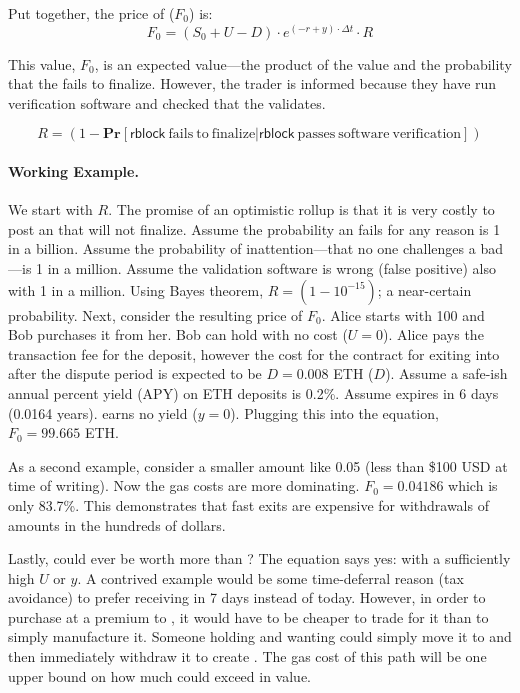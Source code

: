 Put together, the price of \ethxx ($F_0$) is: \[ F_0 = (S_0 + U - D)\cdot e^{(-r+y)\cdot\Delta t} \cdot R \]

This value, $F_0$, is an expected value---the product of the value and the probability that the \rblock fails to finalize. However, the trader is informed because they have run verification software and checked that the \rblock validates.


\[ R = (1-\mathbf{Pr}[ \mathrm{\mathsf{rblock}~fails~to~finalize} |  \mathrm{\mathsf{rblock}~passes~software~verification} ]) \]

\paragraph*{Working Example.} We start with $R$. The promise of an optimistic rollup is that it is very costly to post an \rblock that will not finalize. Assume the probability an \rblock fails for any reason is 1 in a billion. Assume the probability of inattention---that no one challenges a bad \rblock---is 1 in a million. Assume the validation software is wrong (false positive) also with 1 in a million. Using Bayes theorem, $R=(1-10^{-15})$; a near-certain probability. Next, consider the resulting price of $F_0$. Alice starts with 100 \ethxx and Bob purchases it from her. Bob can hold \ethxx with no cost ($U=0$). Alice pays the transaction fee for the deposit, however the cost for the contract for exiting \ethxx into \ethone after the dispute period is expected to be $D=0.008$ ETH ($D$). Assume a safe-ish annual percent yield (APY) on ETH deposits is 0.2\%. Assume \ethxx expires in 6 days (0.0164 years). \ethxx earns no yield ($y=0$). Plugging this into the equation, $F_0=99.665$ ETH.

As a second example, consider a smaller amount like 0.05 \ethxx (less than \$100 USD at time of writing). Now the gas costs are more dominating. $F_0=0.04186$ \ethone which is only 83.7\%. This demonstrates that fast exits are expensive for withdrawals of amounts in the hundreds of dollars.

Lastly, could \ethxx ever be worth more than \ethone? The equation says yes: with a sufficiently high $U$ or $y$. A contrived example would be some time-deferral reason (\eg tax avoidance) to prefer receiving \ethone in 7 days instead of today. However, in order to purchase \ethxx at a premium to \ethone, it would have to be cheaper to trade for it than to simply manufacture it. Someone holding \ethone and wanting \ethxx could simply move it to \layertwo and then immediately withdraw it to create \ethxx. The gas cost of this path will be one upper bound on how much \ethxx could exceed \ethone in value. 

